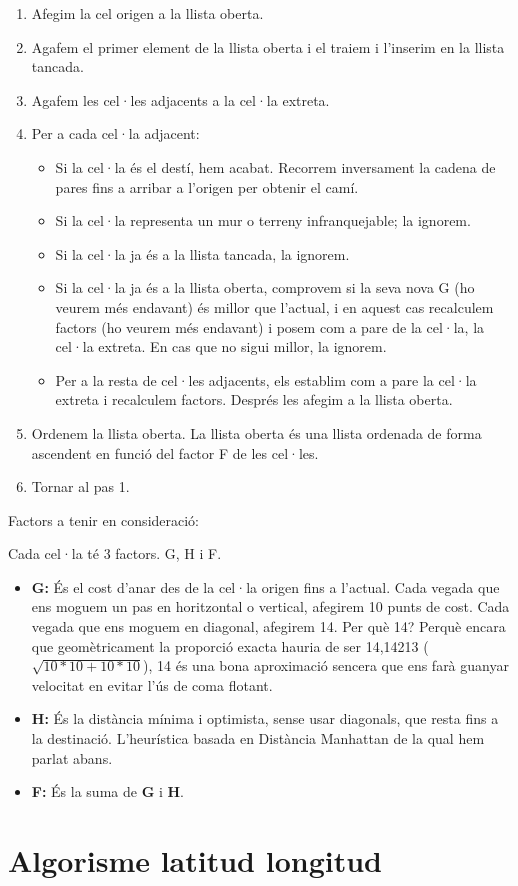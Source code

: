 \documentclass[12pt]{article}
\begin{document}
\begin{enumerate}
	\item Afegim la cel origen a la llista oberta.
	\item Agafem el primer element de la llista oberta i el traiem i l'inserim en la llista tancada.
	\item Agafem les cel·les adjacents a la cel·la extreta.
	\item Per a cada cel·la adjacent:
	\begin{itemize}
		\item Si la cel·la és el destí, hem acabat. Recorrem inversament la cadena de pares fins a arribar a l'origen per obtenir el camí.
		\item Si la cel·la representa un mur o terreny infranquejable; la ignorem.
		\item Si la cel·la ja és a la llista tancada, la ignorem.
		\item Si la cel·la ja és a la llista oberta, comprovem si la seva nova G (ho veurem més endavant) és millor que l'actual, i en aquest cas recalculem factors (ho veurem més endavant) i posem com a pare de la cel·la, la cel·la extreta. En cas que no sigui millor, la ignorem.
		\item Per a la resta de cel·les adjacents, els establim com a pare la cel·la extreta i recalculem factors. Després les afegim a la llista oberta.
	\end{itemize}
	\item Ordenem la llista oberta. La llista oberta és una llista ordenada de forma ascendent en funció del factor F de les cel·les.
	\item Tornar al pas 1.
\end{enumerate}

Factors a tenir en consideració:

Cada cel·la té 3 factors. G, H i F.

\begin{itemize}
	\item \textbf{G:} És el cost d'anar des de la cel·la origen fins a l'actual. Cada vegada que ens moguem un pas en horitzontal o vertical, afegirem 10 punts de cost. Cada vegada que ens moguem en diagonal, afegirem 14. Per què 14? Perquè encara que geomètricament la proporció exacta hauria de ser 14,14213 ($\sqrt{10 * 10 + 10 * 10}$), 14 és una bona aproximació sencera que ens farà guanyar velocitat en evitar l'ús de coma flotant.

	\item \textbf{H:} És la distància mínima i optimista, sense usar diagonals, que resta fins a la destinació. L'heurística basada en Distància Manhattan de la qual hem parlat abans.

	\item \textbf{F:} És la suma de \textbf{G} i \textbf{H}.
\end{itemize}

\clearpage
\section{Algorisme latitud longitud \label{ann:lat_lon}}


\end{document}
